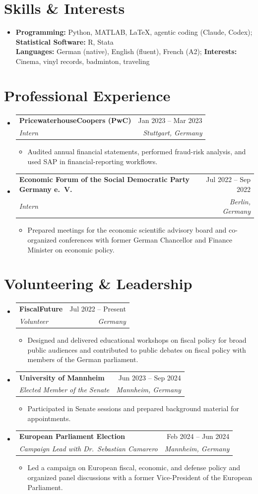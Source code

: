 \documentclass[a4paper,10pt]{article}
\makeatletter
\newcommand{\resumeItem}[1]{
  \item\small{{#1 \vspace{-2pt}}}
}
\newcommand{\resumeSubheading}[4]{
  \vspace{-2pt}\item
    \begin{tabular*}{0.97\textwidth}[t]{l@{\extracolsep{\fill}}r}
      \textbf{#1} & #2 \\
      \textit{\small #3} & \textit{\small #4} \\
    \end{tabular*}\vspace{-7pt}
}
\newcommand{\resumeSubHeadingListStart}{\begin{itemize}[leftmargin=0.15in, label={}]}
\newcommand{\resumeSubHeadingListEnd}{\end{itemize}}
\newcommand{\resumeItemListStart}{\begin{itemize}[leftmargin=0.2in, itemsep=1pt, parsep=0pt, topsep=2pt]}
\newcommand{\resumeItemListEnd}{\end{itemize}\vspace{-6pt}}
\makeatother
\begin{document}
\section{Skills \& Interests}
  \resumeSubHeadingListStart
    \item{
        \normalsize
        \textbf{Programming:} Python, MATLAB, LaTeX, agentic coding (Claude, Codex); \textbf{Statistical Software:} R, Stata \\ \vspace{2pt}
        \textbf{Languages:} German (native), English (fluent), French (A2); \textbf{Interests:} Cinema, vinyl records, badminton, traveling
    }
  \resumeSubHeadingListEnd

\section{Professional Experience}
  \resumeSubHeadingListStart
    \resumeSubheading
      {PricewaterhouseCoopers (PwC)}{Jan 2023 -- Mar 2023}
      {Intern}{Stuttgart, Germany}
      \resumeItemListStart
        \resumeItem{Audited annual financial statements, performed fraud-risk analysis, and used SAP in financial-reporting workflows.}
      \resumeItemListEnd

    \resumeSubheading
      {Economic Forum of the Social Democratic Party Germany e.\ V.}{Jul 2022 -- Sep 2022}
      {Intern}{Berlin, Germany}
      \resumeItemListStart
        \resumeItem{Prepared meetings for the economic scientific advisory board and co-organized conferences with former German Chancellor and Finance Minister on economic policy.}
      \resumeItemListEnd
  \resumeSubHeadingListEnd

\section{Volunteering \& Leadership}
  \resumeSubHeadingListStart
    \resumeSubheading
      {FiscalFuture}{Jul 2022 -- Present}
      {Volunteer}{Germany}
      \resumeItemListStart
        \resumeItem{Designed and delivered educational workshops on fiscal policy for broad public audiences and contributed to public debates on fiscal policy with members of the German parliament.}
      \resumeItemListEnd

    \resumeSubheading
      {University of Mannheim}{Jun 2023 -- Sep 2024}
      {Elected Member of the Senate}{Mannheim, Germany}
      \resumeItemListStart
        \resumeItem{Participated in Senate sessions and prepared background material for appointments.}
      \resumeItemListEnd

    \resumeSubheading
      {European Parliament Election}{Feb 2024 -- Jun 2024}
      {Campaign Lead with Dr.\ Sebastian Camarero}{Mannheim, Germany}
      \resumeItemListStart
        \resumeItem{Led a campaign on European fiscal, economic, and defense policy and organized panel discussions with a former Vice-President of the European Parliament.}
      \resumeItemListEnd

  \resumeSubHeadingListEnd
\end{document}
